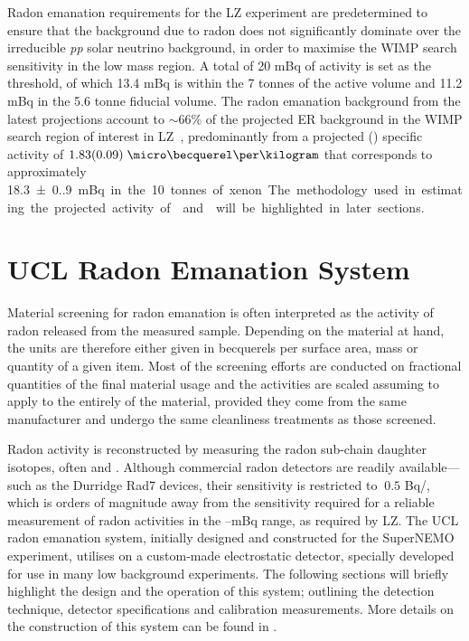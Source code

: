 Radon emanation requirements for the LZ experiment are predetermined to ensure that the background due to radon does not significantly dominate over the irreducible \textit{pp} solar neutrino background, in order to maximise the WIMP search sensitivity in the low mass region. A total of 20 mBq of \RnTTT{} activity is set as the threshold, of which 13.4 mBq is within the 7 tonnes of the active volume and 11.2 mBq in the 5.6 tonne fiducial volume. The radon emanation background from the latest projections account to $\sim66\%$ of the projected ER background in the WIMP search region of interest in LZ~\cite{akerib2018projected}, predominantly from a projected \RnTTT{}(\RnTTZ{}) specific activity of $1.83(0.09) \; {\micro\becquerel\per\kilogram}$ that corresponds to approximately \SI{18.3(0.9)} mBq in the 10 tonnes of xenon. The methodology used in estimating the projected activity of \RnTTT{} and \RnTTZ{} will be highlighted in later sections. 




\section{UCL Radon Emanation System}
\label{sec:ucl_radon_system}

Material screening for radon emanation is often interpreted as the activity of radon released from the measured sample. Depending on the material at hand, the units are therefore either given in becquerels per surface area, mass or quantity of a given item. Most of the screening efforts are conducted on fractional quantities of the final material usage and the activities are scaled assuming to apply to the entirely of the material, provided they come from the same manufacturer and undergo the same cleanliness treatments as those screened.

Radon activity is reconstructed by measuring the radon sub-chain daughter isotopes, often \PoTOE{} and \PoTOF{}. Although commercial radon detectors are readily available---such as the Durridge Rad7 devices, their sensitivity is restricted to $~0.5$ Bq/\cubicmeter{}, which is orders of magnitude away from the sensitivity required for a reliable measurement of radon activities in the --mBq range, as required by LZ. The UCL radon emanation system, initially designed and constructed for the SuperNEMO \neutrinolessDoubleBeta{} experiment, utilises on a custom-made electrostatic detector, specially developed for use in many low background experiments. The following sections will briefly highlight the design and the operation of this system; outlining the detection technique, detector specifications and calibration measurements. More details on the construction of this system can be found in \cite{mott_2013, xin_2017}.


